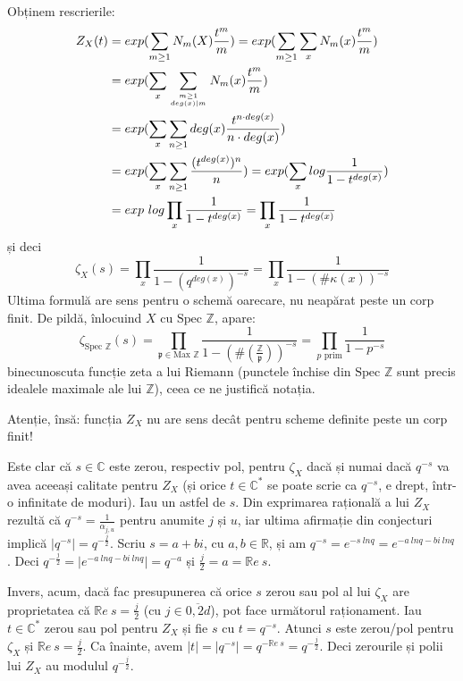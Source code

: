 \documentclass[13pt,openany]{book}
\begin{document}
Obținem rescrierile:
\begin{align*}
Z_X(t)&=exp(\sum_{m\geq 1} N_m(X) \frac{t^m}{m}) = exp(\sum_{m\geq 1} \sum\limits_x N_m(x) \frac{t^m}{m})\\
&=exp(\sum_x \sum_{m \geq 1 \atop deg(x) \mid  m} N_m(x) \frac{t^m}{m})\\
&=exp(\sum_x \sum_{n \geq 1} deg(x) \frac{t^{n\cdot deg(x)}}{n \cdot deg(x)})\\
&=exp(\sum_x \sum_{n\geq 1} \frac{(t^{deg(x)})^n}{n})=exp(\sum_x log \frac{1}{1-t^{deg(x)}})\\
&=exp\ log \prod_x \frac{1}{1-t^{deg(x)}} = \prod_x \frac{1}{1-t^{deg(x)}}
\end{align*}
și deci
$$\zeta_X(s)=\prod_x \frac{1}{1-(q^{deg(x)})^{-s}} = \prod_x \frac{1}{1-(\#\kappa(x))^{-s}}$$
Ultima formulă are sens pentru o schemă oarecare, nu neapărat peste un corp finit. De pildă, înlocuind $X$ cu $\text{Spec }\mathbb{Z}$, apare:
$$\zeta_{\text{Spec }\mathbb{Z}}(s)=\prod_{\mathfrak{p} \in \text{Max }\mathbb{Z}} \frac{1}{1-(\#(\frac{\mathbb{Z}}{\mathfrak{p}}))^{-s}} = \prod_{p\text{ prim}} \frac{1}{1-p^{-s}}$$
binecunoscuta funcție zeta a lui Riemann (punctele închise din $\text{Spec }\mathbb{Z}$ sunt precis idealele maximale ale lui $\mathbb{Z}$), ceea ce ne justifică notația.

Atenție, însă: funcția $Z_X$ nu are sens decât pentru scheme definite peste un corp finit!

Este clar că $s\in\mathbb{C}$ este zerou, respectiv pol, pentru $\zeta_X$ dacă și numai dacă $q^{-s}$ va avea aceeași calitate pentru $Z_X$ (și orice $t \in \mathbb{C}^*$ se poate scrie ca $q^{-s}$, e drept, într-o infinitate de moduri). Iau un astfel de $s$. Din exprimarea rațională a lui $Z_X$ rezultă că $q^{-s}=\frac{1}{\alpha_{j,u}}$ pentru anumite $j$ și $u$, iar ultima afirmație din conjecturi implică $\mid q^{-s}\mid =q^{-\frac{j}{2}}$. Scriu $s=a+bi$, cu $a,b\in\mathbb{R}$, și am $q^{-s}=e^{-s\ ln q} = e^{-a\ ln q- bi\ ln q}$. Deci $q^{-\frac{j}{2}}=\mid e^{-a\ ln q- bi\ ln q}\mid =q^{-a}$ și $\frac{j}{2}=a=\mathbb{R}e\ s$.

Invers, acum, dacă fac presupunerea că orice $s$ zerou sau pol al lui $\zeta_X$ are proprietatea că $\mathbb{R}e\ s=\frac{j}{2}$ (cu $j\in\overline{0,2d}$), pot face următorul raționament. Iau $t \in \mathbb{C}^*$ zerou sau pol pentru $Z_X$ și fie $s$ cu $t=q^{-s}$. Atunci $s$ este zerou/pol pentru $\zeta_X$ și $\mathbb{R}e\ s=\frac{j}{2}$. Ca înainte, avem $\mid t\mid =\mid q^{-s}\mid =q^{-\mathbb{R}e\ s}=q^{-\frac{j}{2}}$. Deci zerourile și polii lui $Z_X$ au modulul $q^{-\frac{j}{2}}$.
\end{document}

